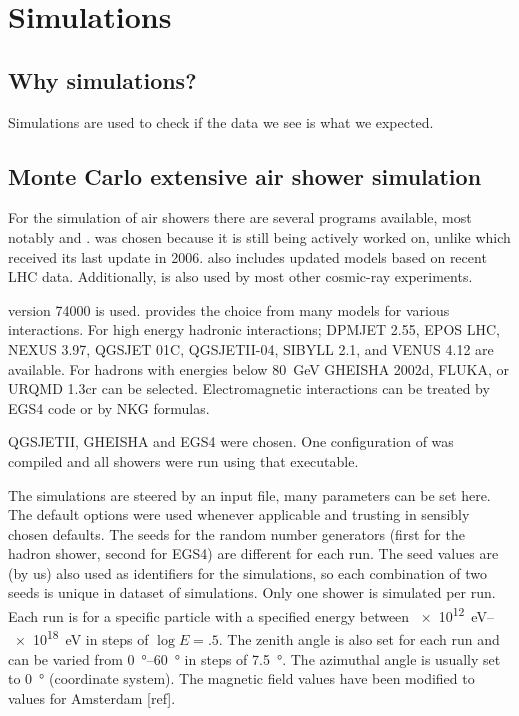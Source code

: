 \chapter{Simulations}
\label{ch:simulations}

\section{Why simulations?}

Simulations are used to check if the data we see is what we expected.



\section{Monte Carlo extensive air shower simulation}

For the simulation of air showers there are several programs available,
most notably \corsika and \aires. \corsika was chosen because it is still
being actively worked on, unlike \aires which received its last update in
2006. \corsika also includes updated models based on recent LHC data.
Additionally, \corsika is also used by most other cosmic-ray
experiments.

\corsika version 74000 is used. \corsika provides the choice from many
models for various interactions. For high energy hadronic interactions;
DPMJET 2.55, EPOS LHC\cite{pierog2013}, NEXUS 3.97, QGSJET 01C,
QGSJETII-04\cite{ostapchenko2013}, SIBYLL 2.1, and VENUS 4.12 are
available. For hadrons with energies below \SI{80}{\giga\electronvolt}
GHEISHA 2002d\cite{fesefeldt1985}, FLUKA, or URQMD 1.3cr can be
selected. Electromagnetic interactions can be treated by EGS4\cite{egs4}
code or by NKG formulas.

QGSJETII, GHEISHA and EGS4 were chosen. One configuration of \corsika
was compiled and all showers were run using that executable.

The simulations are steered by an input file, many parameters can be set
here. The default options were used whenever applicable and trusting in
sensibly chosen defaults. The seeds for the random number generators
(first for the hadron shower, second for EGS4) are different for each
run. The seed values are (by us) also used as identifiers for the
simulations, so each combination of two seeds is unique in dataset of
simulations. Only one shower is simulated per run. Each run is for a
specific particle with a specified energy between
\SIrange{e12}{e18}{\electronvolt} in steps of $\log E = .5$.
The zenith angle is also set for each run and can be varied from
\SIrange{0}{60}{\degree} in steps of \SI{7.5}{\degree}. The azimuthal
angle is usually set to \SI{0}{\degree} (\hisparc coordinate system). 
The magnetic field values have been modified to values for Amsterdam [ref].

